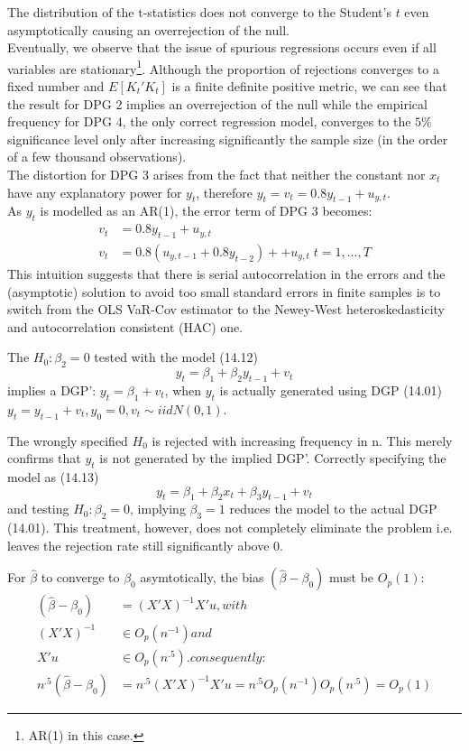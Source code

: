 \documentclass[]{article}
\begin{document}
The distribution of the t-statistics does not converge to the Student's $t$ even asymptotically causing an overrejection of the null.\\
Eventually, we observe that the issue of spurious regressions occurs even if all variables are stationary\footnote{AR(1) in this case.}.
Although the proportion of rejections converges to a fixed number and $E[K_{t}'K_{t}]$ is a finite definite positive metric, we can see that the result for DPG 2 implies an overrejection of the null while the empirical frequency for DPG 4, the only correct regression model, converges to the $5\%$ significance level only after increasing significantly the sample size (in the order of a few thousand observations). \\  
The distortion for DPG 3 arises from the fact that neither the constant nor $x_t$ have any explanatory power for $y_t$, therefore $y_t = v_t = 0.8y_{t-1}+u_{y,t}$.\\ As $y_t$ is modelled as an AR(1), the error term of DPG 3 becomes:
\begin{align*}
	v_t &= 0.8y_{t-1}+u_{y,t} \\
	v_t &= 0.8(u_{y,t-1} + 0.8y_{t-2}) + +u_{y,t} \; t=1,...,T
\end{align*}
This intuition suggests that there is serial autocorrelation in the errors and the (asymptotic) solution to avoid too small standard errors in finite samples is to switch from the OLS VaR-Cov estimator to the Newey-West heteroskedasticity and autocorrelation consistent (HAC) one.



The $H_0: \beta_2=0$ tested with the model (14.12) $$y_t = \beta_1 + \beta_2y_{t-1} + v_t$$ implies a DGP': $y_t = \beta_1 + v_t$, when $y_t$ is actually generated using DGP (14.01) $y_t = y_{t-1} + v_t, y_0=0, v_t \sim iidN(0,1)$.

The wrongly specified $H_0$ is rejected with increasing frequency in n. This merely confirms that $y_t$ is not generated by the implied DGP'. Correctly specifying the model as (14.13) $$y_t = \beta_1 + \beta_2 x_t + \beta_3 y_{t-1} + v_t$$ and testing $H_0:\beta_2=0$, implying $\beta_3=1$ reduces the model to the actual DGP (14.01). This treatment, however, does not completely eliminate the problem i.e. leaves the rejection rate still significantly above 0.

For $\hat{\beta}$ to converge to $\beta_0$ asymtotically, the bias $(\hat{\beta} - \beta_0)$ must be $O_p(1)$: \begin{align*}
	(\hat{\beta} - \beta_0) &= (X'X)^{-1}X'u, with\\
	(X'X)^{-1} &\in O_p(n^{-1}) and \\
	X'u &\in O_p(n^{.5}). consequently:\\
	n^{.5}(\hat{\beta} - \beta_0) &= n^{.5}(X'X)^{-1}X'u = n^{.5} O_p(n^{-1})O_p(n^{.5}) = O_p(1)
\end{align*}
\end{document}

